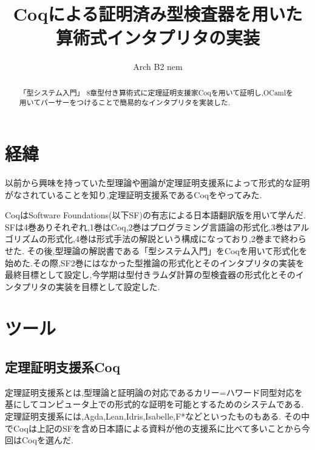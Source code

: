 \documentclass[fleqn,a4j,10pt]{jsarticle}
\begin{document}

\title{Coqによる証明済み型検査器を用いた算術式インタプリタの実装}

\author{ Arch B2 nem }

\newcommand{\bnfdef}{::=}
\newcommand{\bs}{\boldsymbol}
\newlength{\len}
\settowidth{\len}{$\bnfdef$}
\newcommand{\bnfor}{\makebox[\len]{$|$}}


\begin{abstract}
  「型システム入門」\cite{TaPL} 8章型付き算術式に定理証明支援家Coqを用いて証明し,OCamlを用いてパーサーをつけることで簡易的なインタプリタを実装した.
\end{abstract}

\maketitle
\thispagestyle{empty}

\section{経緯}
以前から興味を持っていた型理論や圏論が定理証明支援系によって形式的な証明がなされていることを知り,定理証明支援系であるCoqをやってみた.\par
CoqはSoftware Foundations\cite{SF}(以下SF)の有志による日本語翻訳版\cite{sfja}を用いて学んだ. SFは4巻ありそれぞれ,1巻はCoq,2巻はプログラミング言語論の形式化,3巻はアルゴリズムの形式化,4巻は形式手法の解説という構成になっており,2巻まで終わらせた. その後,型理論の解説書である「型システム入門」をCoqを用いて形式化を始めた.その際,SF2巻にはなかった型推論の形式化とそのインタプリタの実装を最終目標として設定し,今学期は型付きラムダ計算の型検査器の形式化とそのインタプリタの実装を目標として設定した.\par

\section{ツール}
\subsection{定理証明支援系Coq}
定理証明支援系とは,型理論と証明論の対応であるカリー=ハワード同型対応を基にしてコンピュータ上での形式的な証明を可能とするためのシステムである. 定理証明支援系には,Agda,Lean,Idris,Isabelle,F*などといったものもある. その中でCoqは上記のSFを含め日本語による資料が他の支援系に比べて多いことから今回はCoqを選んだ. \par
\end{document}
